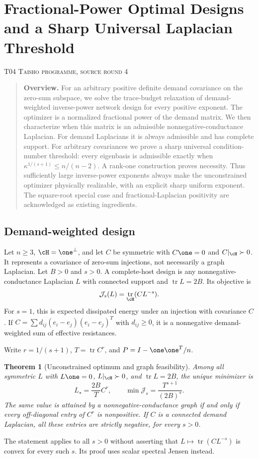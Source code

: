 \documentclass[11pt,a4paper]{article}
\newtheorem{theorem}{Theorem}[section]
\theoremstyle{definition}\newtheorem{definition}[theorem]{Definition}
\theoremstyle{remark}\newtheorem{remark}[theorem]{Remark}
\DeclareMathOperator{\tr}{tr}\DeclareMathOperator{\supp}{supp}\DeclareMathOperator{\TV}{TV}
\numberwithin{equation}{section}
\begin{document}
\clearpage
\section[T04 --- Fractional-Power Optimal Designs and a Sharp Universal Laplacian Threshold]{Fractional-Power Optimal Designs and a Sharp Universal Laplacian Threshold}\label{contrib-T04}
\noindent\textsc{T04 \quad Taisho programme, source round 4}\par\medskip



\begin{quote}\small\textbf{Overview.} For an arbitrary positive definite demand covariance on the zero-sum subspace, we solve the trace-budget relaxation of demand-weighted inverse-power network design for every positive exponent. The optimizer is a normalized fractional power of the demand matrix. We then characterize when this matrix is an admissible nonnegative-conductance Laplacian. For demand Laplacians it is always admissible and has complete support. For arbitrary covariances we prove a sharp universal condition-number threshold: every eigenbasis is admissible exactly when $\kappa^{1/(s+1)}\le n/(n-2)$. A rank-one construction proves necessity. Thus sufficiently large inverse-power exponents always make the unconstrained optimizer physically realizable, with an explicit sharp uniform exponent. The square-root special case and fractional-Laplacian positivity are acknowledged as existing ingredients.\end{quote}
\subsection{Demand-weighted design}\label{T04-sec-1}
Let $n\ge3$, $\cH=\one^\perp$, and let $C$ be symmetric with $C\one=0$ and $C|_{\cH}\succ0$. It represents a covariance of zero-sum injections, not necessarily a graph Laplacian. Let $B>0$ and $s>0$. A complete-host design is any nonnegative-conductance Laplacian $L$ with connected support and $\tr L=2B$. Its objective is
\[
 \mathcal J_s(L)=\tr_{\cH}(C L^{-s}).
\]
For $s=1$, this is expected dissipated energy under an injection with covariance $C$. If $C=\sum d_{ij}(e_i-e_j)(e_i-e_j)^T$ with $d_{ij}\ge0$, it is a nonnegative demand-weighted sum of effective resistances.

Write $r=1/(s+1)$, $T=\tr C^r$, and $P=I-\one\one^T/n$.
\begin{theorem}[Unconstrained optimum and graph feasibility]\label{T04-thm:opt}
Among all symmetric $L$ with $L\one=0$, $L|_{\cH}\succ0$, and $\tr L=2B$, the unique minimizer is
\[
 L_\star=\frac{2B}{T}C^r,\qquad
 \min\mathcal J_s=\frac{T^{s+1}}{(2B)^s}.
\]
The same value is attained by a nonnegative-conductance graph if and only if every off-diagonal entry of $C^r$ is nonpositive. If $C$ is a connected demand Laplacian, all these entries are strictly negative, for every $s>0$.
\end{theorem}
The statement applies to all $s>0$ without asserting that $L\mapsto\tr(C L^{-s})$ is convex for every such $s$. Its proof uses scalar spectral Jensen instead.
\end{document}

